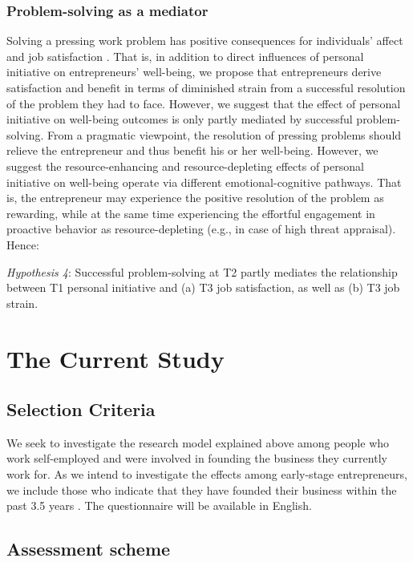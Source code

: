 \documentclass[man, 12pt, a4paper, noextraspace]{apa6}
\begin{document}
\subsubsection{Problem-solving as a mediator}
Solving a pressing work problem has positive consequences for individuals' affect and job satisfaction \parencite[e.g.,][]{Ayres2007}. 
That is, in addition to direct influences of personal initiative on entrepreneurs' well-being, we propose that entrepreneurs derive satisfaction and benefit in terms of diminished strain from a successful resolution of the problem they had to face. 
However, we suggest that the effect of personal initiative on well-being outcomes is only partly mediated by successful problem-solving.
From a pragmatic viewpoint, the resolution of pressing problems should relieve the entrepreneur and thus benefit his or her well-being. 
However, we suggest the resource-enhancing and resource-depleting effects of personal initiative on well-being operate via different emotional-cognitive pathways.
That is, the entrepreneur may experience the positive resolution of the problem as rewarding, while at the same time experiencing the effortful engagement in proactive behavior as resource-depleting (e.g., in case of high threat appraisal). 
Hence: 

\textit{Hypothesis 4}: Successful problem-solving at T2 partly mediates the relationship between T1 personal initiative and (a) T3 job satisfaction, as well as (b) T3 job strain. 

\section{The Current Study}

\subsection{Selection Criteria} 

We seek to investigate the research model explained above among people who work self-employed and were involved in founding the business they currently work for. 
As we intend to investigate the effects among early-stage entrepreneurs, we include those who indicate that they have founded their business within the past 3.5 years \parencite{Bosma.2019}.
The questionnaire will be available in English. \par 

\subsection{Assessment scheme}
\end{document}
